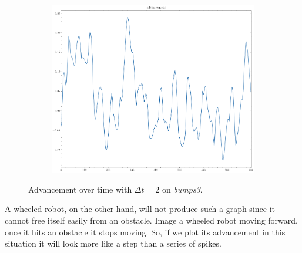 \documentclass[../document.tex]{subfiles}
\begin{document}
    \begin{figure}[htbp]
        \centering
        \begin{subfigure}[b]{0.45\textwidth}
            \includegraphics[width=\linewidth]{../img/3/find_tr/100-bumps3}
        \end{subfigure}
    
    \caption{Advancement over time with  $\Delta t = 2$ on \emph{bumps3}.}
    \label{fig : krock-bumps-advs}
    \end{figure}
    A wheeled robot, on the other hand, will not produce such a graph since it cannot free itself easily from an obstacle. Image a wheeled robot moving forward, once it hits an obstacle it stops moving. So, if we plot its advancement in this situation it will look more like a step than a series of spikes.
\end{document}
